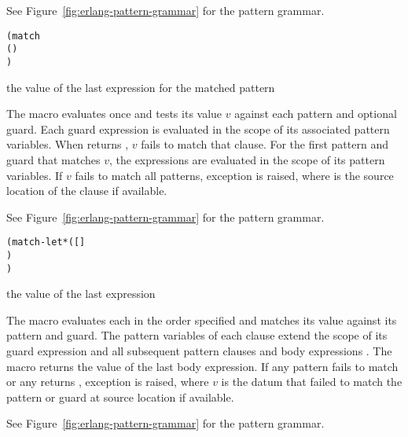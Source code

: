 See Figure~\ref{fig:erlang-pattern-grammar} for the pattern grammar.

\begin{syntax}\begin{alltt}
(match 
  (    \etc{})
  \etc{})\strut\end{alltt}
\end{syntax}
\returns{} the value of the last expression   \etc{}
for the matched pattern

The  macro evaluates  once and tests its value
$v$ against each pattern and optional guard.  Each guard expression
 is evaluated in the scope of its associated pattern
variables. When  returns , $v$ fails to match that
clause.  For the first pattern and guard that matches $v$, the
expressions   \etc{} are evaluated in the scope of its
pattern variables. If $v$ fails to match all patterns, exception
 is raised, where  is the
source location of the  clause if available.

See Figure~\ref{fig:erlang-pattern-grammar} for the pattern grammar.

\begin{syntax}\begin{alltt}
(match-let* ([  ]
             \etc{})
    \etc{})\strut\end{alltt}
\end{syntax}
\returns{} the value of the last expression   \etc{}

The  macro evaluates each  in the order
specified and matches its value against its pattern and guard.  The
pattern variables of each clause extend the scope of its guard
expression  and all subsequent pattern clauses and body
expressions   \etc{}.  The  macro
returns the value of the last body expression.  If any pattern fails
to match or any  returns , exception
 is raised, where $v$ is the datum
that failed to match the pattern or guard at source location 
if available.

See Figure~\ref{fig:erlang-pattern-grammar} for the pattern grammar.

